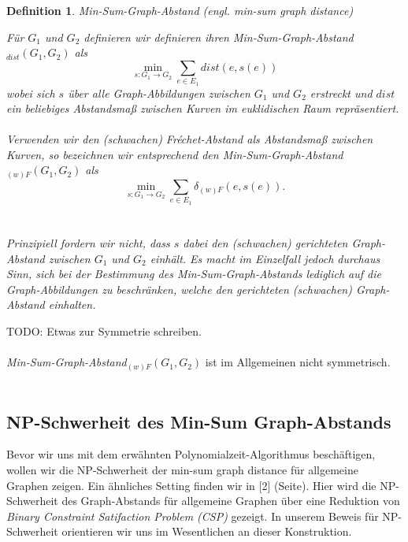 \documentclass[a4paper, 12pt, twoside]{article}
\theoremstyle{Format1} %
\newtheorem{Def}{Definition}[section]       %
\begin{document}
\begin{Def}
	Min-Sum-Graph-Abstand (engl. min-sum graph distance)

	Für $G_1$ und $G_2$ definieren wir definieren ihren \textit{Min-Sum-Graph-Abstand}$_{dist}(G_1, G_2)$ als
	$$\min_{s: G_1 \to G_2} \sum_{e \in E_1} dist(e, s(e))$$
	wobei sich $s$ über alle Graph-Abbildungen zwischen $G_1$ und $G_2$ erstreckt und $dist$ ein beliebiges Abstandsmaß zwischen Kurven im euklidischen Raum repräsentiert.
	\\
	\\
	Verwenden wir den (schwachen) Fréchet-Abstand als Abstandsmaß zwischen Kurven, so bezeichnen wir entsprechend den \textit{Min-Sum-Graph-Abstand}$_{(w)F}(G_1, G_2)$ als
	$$\min_{s: G_1 \to G_2} \sum_{e \in E_1} \delta_{(w)F}(e, s(e)).$$
	\\
	\\
	Prinzipiell fordern wir nicht, dass $s$ dabei den (schwachen) gerichteten Graph-Abstand zwischen $G_1$ und $G_2$ einhält.
	Es macht im Einzelfall jedoch durchaus Sinn, sich bei der Bestimmung des \textit{Min-Sum-Graph-Abstands} lediglich auf die Graph-Abbildungen zu beschränken,
	welche den gerichteten (schwachen) Graph-Abstand einhalten.
\end{Def}

TODO: Etwas zur Symmetrie schreiben.
\\
\\
\textit{Min-Sum-Graph-Abstand}$_{(w)F}(G_1, G_2)$ ist im Allgemeinen nicht symmetrisch.
\\
\\
\subsection{NP-Schwerheit des Min-Sum Graph-Abstands}

Bevor wir uns mit dem erwähnten Polynomialzeit-Algorithmus beschäftigen, wollen wir die NP-Schwerheit der min-sum graph distance für allgemeine Graphen zeigen.
Ein ähnliches Setting finden wir in [2] (Seite). Hier wird die NP-Schwerheit des Graph-Abstands für allgemeine Graphen über eine Reduktion von
\textit{Binary Constraint Satifaction Problem (CSP)} gezeigt. In unserem Beweis für NP-Schwerheit orientieren wir uns im Wesentlichen an dieser Konstruktion.
\end{document}
